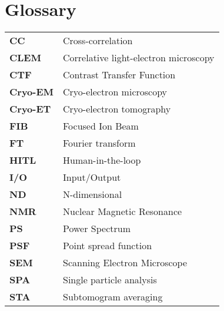 \chapter{Glossary}


\begin{tabularx}{\linewidth}{@{}>{\bfseries}l X} %
CC & Cross-correlation \\
CLEM & Correlative light-electron microscopy \\
CTF & Contrast Transfer Function \\
Cryo-EM & Cryo-electron microscopy \\
Cryo-ET & Cryo-electron tomography \\
FIB & Focused Ion Beam \\
FT & Fourier transform \\
HITL & Human-in-the-loop \\
I/O & Input/Output \\
ND & N-dimensional \\
NMR & Nuclear Magnetic Resonance \\
PS & Power Spectrum \\
PSF & Point spread function \\
SEM & Scanning Electron Microscope \\
SPA & Single particle analysis \\
STA & Subtomogram averaging \\
\end{tabularx}

